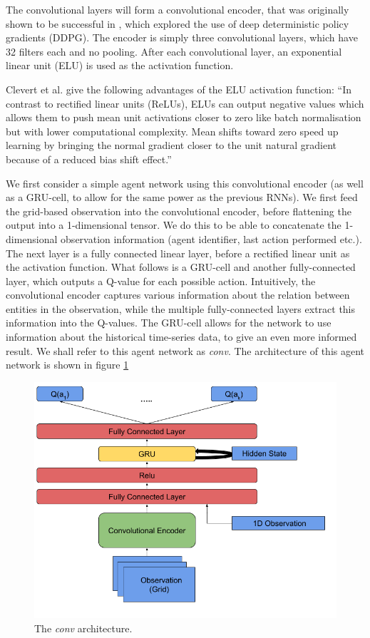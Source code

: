 The convolutional layers will form a convolutional encoder, that was originally shown to be successful in \cite{ddpg}, which explored the use of deep deterministic policy gradients (DDPG). The encoder is simply three convolutional layers, which have 32 filters each and no pooling. After each convolutional layer, an exponential linear unit (ELU) is used as the activation function.

Clevert et al. \cite{elu} give the following advantages of the ELU activation function: ``In contrast to rectified linear units (ReLUs), ELUs can output negative values which allows them to push mean unit activations closer to zero like batch normalisation but with lower computational complexity. Mean shifts toward zero speed up learning by bringing the normal gradient closer to the unit natural gradient because of a reduced bias shift effect.''


We first consider a simple agent network using this convolutional encoder (as well as a GRU-cell, to allow for the same power as the previous RNNs). We first feed the grid-based observation into the convolutional encoder, before flattening the output into a 1-dimensional tensor. We do this to be able to concatenate the 1-dimensional observation information (agent identifier, last action performed etc.). The next layer is a fully connected linear layer, before a rectified linear unit as the activation function. What follows is a GRU-cell and another fully-connected layer, which outputs a Q-value for each possible action. Intuitively, the convolutional encoder captures various information about the relation between entities in the observation, while the multiple fully-connected layers extract this information into the Q-values. The GRU-cell allows for the network to use information about the historical time-series data, to give an even more informed result. We shall refer to this agent network as \textit{conv}. The architecture of this agent network is shown in figure \ref{fig:conv_agent_diagram}

\begin{figure}
    \centering
    \includegraphics[scale=0.45]{images/agent_diagrams/rnn_conv_dpdpg_agent_diagram.png}
    \caption{The \textit{conv} architecture.}
    \label{fig:conv_agent_diagram}
\end{figure}

